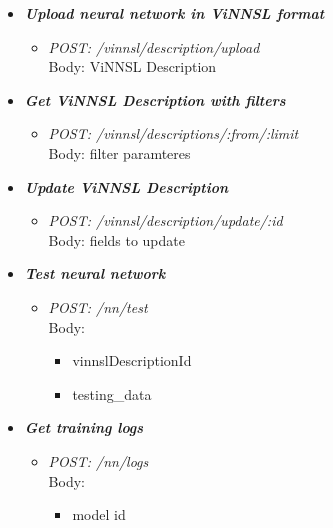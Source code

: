 \begin{itemize}


\item \textbf{\textit{Upload neural network in ViNNSL format}}
\begin{itemize}
\item \emph{POST: /vinnsl/description/upload}
\\Body:  ViNNSL Description
\end{itemize}




\item \textbf{\textit{Get ViNNSL Description with filters}}
\begin{itemize}
\item \emph{POST: /vinnsl/descriptions/:from/:limit}
\\Body: filter paramteres
\end{itemize}




\item \textbf{\textit{Update ViNNSL Description}}
\begin{itemize}
\item \emph{POST: /vinnsl/description/update/:id}
\\Body: fields to update
\end{itemize}




\item \textbf{\textit{Test neural network}}
\begin{itemize}
\item \emph{POST: /nn/test}
\\Body: 
\begin{itemize}
\item vinnslDescriptionId
\item testing\_data
\end{itemize}

\end{itemize}





\item \textbf{\textit{Get training logs}}
\begin{itemize}
\item \emph{POST: /nn/logs}
\\Body: 
\begin{itemize}
\item model id
\end{itemize}

\end{itemize}



\end{itemize}




